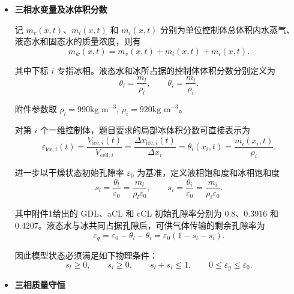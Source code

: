 \documentclass[bwprint]{gmcmthesis}
\numberwithin{equation}{section}
\numberwithin{figure}{section}
\begin{document}
\begin{itemize}
\renewcommand{\labelitemi}{$\blacktriangleright$}
\item \textbf {三相水变量及冰体积分数}

 记 \(m_v(x,t)\)、\(m_l(x,t)\) 和 \(m_i(x,t)\) 分别为单位控制体总体积内水蒸气、液态水和固态水的质量浓度，则有
\begin{equation}
m_w(x,t) = m_v(x,t) + m_l(x,t) + m_i(x,t). 
\label{eq:src:4-11}
\end{equation}

 其中下标 \(i\) 专指冰相。液态水和冰所占据的控制体体积分数分别定义为
\begin{equation}
\theta_l = \frac{m_l}{\rho_l}, \qquad \theta_i = \frac{m_i}{\rho_i}.
\label{eq:src:4-12}
\end{equation}

 附件参数取 $\rho_l = 990\text{kg m}^{-3}$,  $\rho_i = 920\text{kg m}^{-3}$。

 对第 \(i\) 个一维控制体，题目要求的局部冰体积分数可直接表示为
\begin{equation}
\varepsilon_{\text{ice},i}(t) = \frac{V_{\text{ice},i}(t)}{V_{\text{cell},i}} = \frac{\Delta x_{\text{ice},i}(t)}{\Delta x_i} = \theta_i(x_i, t) = \frac{m_i(x_i, t)}{\rho_i}. 
\label{eq:src:4-13}
\end{equation}


 进一步以干燥状态初始孔隙率 \(\varepsilon_0\) 为基准，定义液相饱和度和冰相饱和度
\begin{equation}
s_l = \frac{\theta_l}{\varepsilon_0} = \frac{m_l}{\rho_l \varepsilon_0}, \qquad s_i = \frac{\theta_i}{\varepsilon_0} = \frac{m_i}{\rho_i \varepsilon_0}. 
\label{eq:src:4-14}
\end{equation}

 其中附件1给出的 GDL、aCL 和 cCL 初始孔隙率分别为 0.8、0.3916 和 0.4207。液态水与冰共同占据孔隙后，可供气体传输的剩余孔隙率为
\begin{equation}
\varepsilon_g = \varepsilon_0 - \theta_l - \theta_i = \varepsilon_0(1 - s_l - s_i).
 \label{eq:src:4-15}
\end{equation}

 因此模型状态必须满足如下物理条件：
\begin{equation}
s_l \geq 0, \qquad s_i \geq 0, \qquad s_l + s_i \leq 1, \qquad 0 \leq \varepsilon_g \leq \varepsilon_0. 
\label{eq:src:4-16}
\end{equation}


\item \textbf {三相质量守恒}


\end{itemize}
\end{document}
